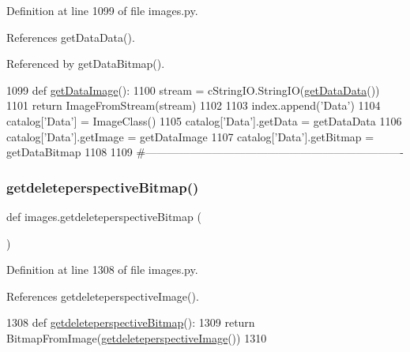 Definition at line 1099 of file images.\+py.



References get\+Data\+Data().



Referenced by get\+Data\+Bitmap().


\begin{DoxyCode}
1099 \textcolor{keyword}{def }\hyperlink{namespaceimages_a2e4a6f1439de847a5ce440e0ea37edaa}{getDataImage}():
1100     stream = cStringIO.StringIO(\hyperlink{namespaceimages_ab1c77e22e2c32cd1bf3bb8fe77f8298d}{getDataData}())
1101     \textcolor{keywordflow}{return} ImageFromStream(stream)
1102 
1103 index.append(\textcolor{stringliteral}{'Data'})
1104 catalog[\textcolor{stringliteral}{'Data'}] = ImageClass()
1105 catalog[\textcolor{stringliteral}{'Data'}].getData = getDataData
1106 catalog[\textcolor{stringliteral}{'Data'}].getImage = getDataImage
1107 catalog[\textcolor{stringliteral}{'Data'}].getBitmap = getDataBitmap
1108 
1109 \textcolor{comment}{#----------------------------------------------------------------------}
\end{DoxyCode}
\mbox{\label{namespaceimages_aa5a811e2cd617bf0f033ba016f65e71b}} 
\subsubsection{\texorpdfstring{getdeleteperspective\+Bitmap()}{getdeleteperspectiveBitmap()}}
{\footnotesize\ttfamily def images.\+getdeleteperspective\+Bitmap (\begin{DoxyParamCaption}{ }\end{DoxyParamCaption})}



Definition at line 1308 of file images.\+py.



References getdeleteperspective\+Image().


\begin{DoxyCode}
1308 \textcolor{keyword}{def }\hyperlink{namespaceimages_aa5a811e2cd617bf0f033ba016f65e71b}{getdeleteperspectiveBitmap}():
1309     \textcolor{keywordflow}{return} BitmapFromImage(\hyperlink{namespaceimages_a6f233689e4bb013dc7be2b86300ce54e}{getdeleteperspectiveImage}())
1310 
\end{DoxyCode}
\mbox{\label{namespaceimages_adf4a80b7f1fe515d188f8edc76ad9f8c}} 
